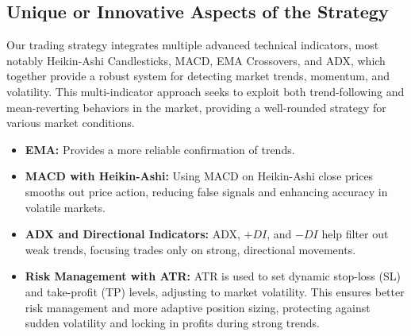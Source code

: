 \documentclass[12pt]{article}
\begin{document}
\subsection{Unique or Innovative Aspects of the Strategy}
Our trading strategy integrates multiple advanced technical indicators, most notably Heikin-Ashi Candlesticks, MACD, EMA Crossovers, and ADX, which together provide a robust system for detecting market trends, momentum, and volatility. This multi-indicator approach seeks to exploit both trend-following and mean-reverting behaviors in the market, providing a well-rounded strategy for various market conditions.

\begin{itemize}
    \item \textbf{EMA:} Provides a more reliable confirmation of trends.
    \item \textbf{MACD with Heikin-Ashi:} Using MACD on Heikin-Ashi close prices smooths out price action, reducing false signals and enhancing accuracy in volatile markets.
    \item \textbf{ADX and Directional Indicators:} ADX, $+DI$, and $-DI$ help filter out weak trends, focusing trades only on strong, directional movements.
    \item \textbf{Risk Management with ATR:} ATR is used to set dynamic stop-loss (SL) and take-profit (TP) levels, adjusting to market volatility. This ensures better risk management and more adaptive position sizing, protecting against sudden volatility and locking in profits during strong trends.
\end{itemize}

\newpage
\end{document}
